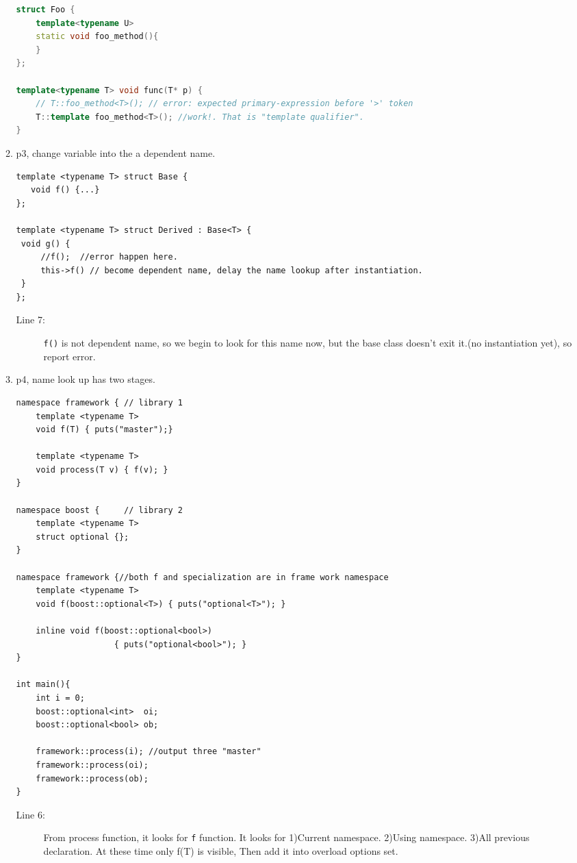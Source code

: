 \documentclass[a4paper,11pt,twoside]{book}
\begin{document}
\begin{itemize}
\begin{enumerate}
\begin{lstlisting}[frame=single, language=c++]
struct Foo {
	template<typename U>
	static void foo_method(){
	}
};

template<typename T> void func(T* p) {
	// T::foo_method<T>(); // error: expected primary-expression before '>' token	
	T::template foo_method<T>(); //work!. That is "template qualifier".
}
\end{lstlisting}

\item p3, change variable into the a dependent name. 
\begin{lstlisting}[]
template <typename T> struct Base {
   void f() {...}
};

template <typename T> struct Derived : Base<T> {
 void g() {
     //f();  //error happen here. 
     this->f() // become dependent name, delay the name lookup after instantiation.
 }
};
\end{lstlisting}
\begin{description}
	\item[Line 7:] \texttt{f()} is not dependent name, so we begin to look for this name now, but the base class doesn't exit it.(no instantiation yet), so report error.
\end{description}


\item p4, name look up has two stages. 

\begin{lstlisting}[]
namespace framework { // library 1
	template <typename T>
	void f(T) { puts("master");}
 
	template <typename T>
	void process(T v) { f(v); }
}
 
namespace boost {     // library 2
	template <typename T>
	struct optional {};
}
 
namespace framework {//both f and specialization are in frame work namespace
	template <typename T>
	void f(boost::optional<T>) { puts("optional<T>"); }
    
	inline void f(boost::optional<bool>) 
	                { puts("optional<bool>"); }
}
 
int main(){
	int i = 0;
	boost::optional<int>  oi;
	boost::optional<bool> ob;
  
	framework::process(i); //output three "master"
	framework::process(oi);
	framework::process(ob);
}
\end{lstlisting}

\begin{description}
	\item[Line 6:] From process function, it looks for \texttt{f} function. It looks for 1)Current namespace. 2)Using namespace. 3)All previous declaration.
	 At these time only f(T) is visible, Then add it into overload options set.  
	 

\end{description}
\end{enumerate}
\end{itemize}
\end{document}
